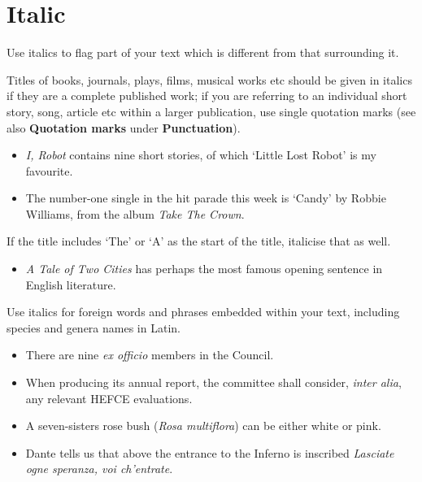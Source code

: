 \documentclass[11pt,a4paper]{book}
\newcommand{\cmark}{{\color{green(html/cssgreen)}\checkmark}}%
\begin{document}
		\section{Italic}	
		Use italics to flag part of your text which is different from that surrounding it.\par
		Titles of books, journals, plays, films, musical works etc should be given in italics if they are a complete published work; if you are referring to an individual short story, song, article etc within a larger publication, use single quotation marks (see also \textbf{Quotation marks} under \textbf{Punctuation}).
			{\firasans \begin{mdframed}[backgroundcolor=aliceblue] \begin{itemize}[label=\cmark]
				\item \textit{I, Robot} contains nine short stories, of which `Little Lost Robot' is my favourite.
				\item The number-one single in the hit parade this week is `Candy' by Robbie Williams, from the album \textit{Take The Crown}.
			\end{itemize} \end{mdframed} }	
		If the title includes `The' or `A' as the start of the title, italicise that as well.
			{\firasans \begin{mdframed}[backgroundcolor=aliceblue] \begin{itemize}[label=\cmark]
				\item \textit{A Tale of Two Cities} has perhaps the most famous opening sentence in English literature.	
			\end{itemize} \end{mdframed} }	
		\newpage
		Use italics for foreign words and phrases embedded within your text, including species and genera names in Latin.
			{\firasans \begin{mdframed}[backgroundcolor=aliceblue] \begin{itemize}[label=\cmark]
				\item There are nine \textit{ex officio} members in the Council.
				\item When producing its annual report, the committee shall consider, \textit{inter alia}, any relevant HEFCE evaluations.
				\item A seven-sisters rose bush (\textit{Rosa multiflora}) can be either white or pink.
				\item Dante tells us that above the entrance to the Inferno is inscribed \textit{Lasciate ogne speranza, voi ch'entrate}.
			\end{itemize} \end{mdframed} }
\end{document}
